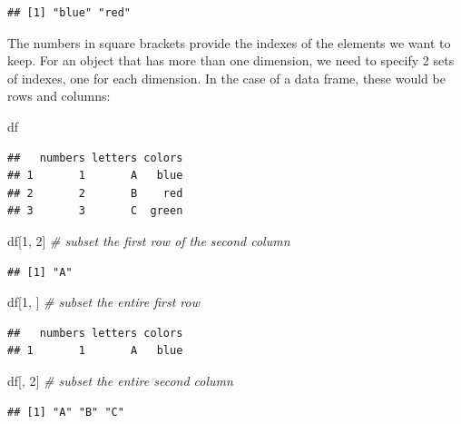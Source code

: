 \documentclass[
]{book}
\newenvironment{Shaded}{\begin{snugshade}}{\end{snugshade}}
\newcommand{\CommentTok}[1]{\textcolor[rgb]{0.56,0.35,0.01}{\textit{#1}}}
\newcommand{\DecValTok}[1]{\textcolor[rgb]{0.00,0.00,0.81}{#1}}
\newcommand{\NormalTok}[1]{#1}
\begin{document}
\begin{verbatim}
## [1] "blue" "red"
\end{verbatim}

The numbers in square brackets provide the indexes of the elements we want to
keep. For an object that has more than one dimension, we need to specify 2 sets
of indexes, one for each dimension. In the case of a data frame, these would be
rows and columns:

\begin{Shaded}
\begin{Highlighting}[]
\NormalTok{df}
\end{Highlighting}
\end{Shaded}

\begin{verbatim}
##   numbers letters colors
## 1       1       A   blue
## 2       2       B    red
## 3       3       C  green
\end{verbatim}

\begin{Shaded}
\begin{Highlighting}[]
\NormalTok{df[}\DecValTok{1}\NormalTok{, }\DecValTok{2}\NormalTok{] }\CommentTok{\# subset the first row of the second column}
\end{Highlighting}
\end{Shaded}

\begin{verbatim}
## [1] "A"
\end{verbatim}

\begin{Shaded}
\begin{Highlighting}[]
\NormalTok{df[}\DecValTok{1}\NormalTok{, ] }\CommentTok{\# subset the entire first row}
\end{Highlighting}
\end{Shaded}

\begin{verbatim}
##   numbers letters colors
## 1       1       A   blue
\end{verbatim}

\begin{Shaded}
\begin{Highlighting}[]
\NormalTok{df[, }\DecValTok{2}\NormalTok{] }\CommentTok{\# subset the entire second column}
\end{Highlighting}
\end{Shaded}

\begin{verbatim}
## [1] "A" "B" "C"
\end{verbatim}
\end{document}
